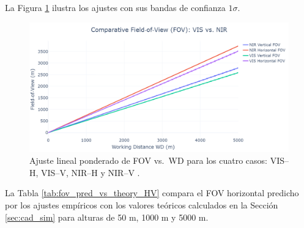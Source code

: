      La Figura \ref{fig:fov_reg_combined} ilustra los ajustes con sus bandas de confianza \(1\sigma\).
     
     \begin{figure}[H]
     \centering
       \includegraphics[width=1\linewidth]{Figures/C4/FOV.png}
       \caption{Ajuste lineal ponderado de FOV vs.\ WD para los cuatro casos: VIS–H, VIS–V, NIR–H y NIR–V .}
       \label{fig:fov_reg_combined}
     \end{figure}
     
 
     
     La Tabla \ref{tab:fov_pred_vs_theory_HV} compara el FOV horizontal predicho
     por los ajustes empíricos con los valores teóricos calculados en
     la Sección \ref{sec:cad_sim} para alturas de 50 m, 1000 m y 5000 m.
     
 
     
